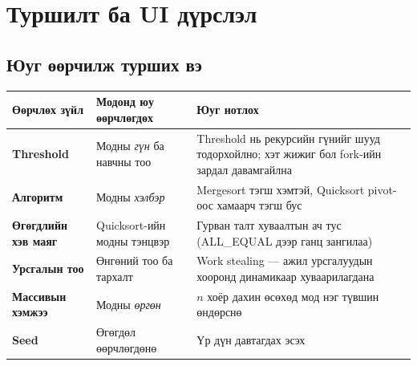 \documentclass[11pt,a4paper]{article}
\begin{document}
\section{Туршилт ба UI дүрслэл}

\subsection{Юуг өөрчилж турших вэ}
\begin{center}
\small
\begin{tabular}{L{3.0cm}L{4.6cm}L{6.6cm}}
\toprule
Өөрчлөх зүйл & Модонд юу өөрчлөгдөх & Юуг нотлох \\
\midrule
\textbf{Threshold} & Модны \emph{гүн} ба навчны тоо &
Threshold нь рекурсийн гүнийг шууд тодорхойлно; хэт жижиг бол fork-ийн
зардал давамгайлна \\
\textbf{Алгоритм} & Модны \emph{хэлбэр} &
Mergesort тэгш хэмтэй, Quicksort pivot-оос хамаарч тэгш бус \\
\textbf{Өгөгдлийн хэв маяг} & Quicksort-ийн модны тэнцвэр &
Гурван талт хуваалтын ач тус (ALL\_EQUAL дээр ганц зангилаа) \\
\textbf{Урсгалын тоо} & Өнгөний тоо ба тархалт &
Work stealing --- ажил урсгалуудын хооронд динамикаар хуваарилагдана \\
\textbf{Массивын хэмжээ} & Модны \emph{өргөн} &
$n$ хоёр дахин өсөхөд мод нэг түвшин өндөрснө \\
\textbf{Seed} & Өгөгдөл өөрчлөгдөнө & Үр дүн давтагдах эсэх \\
\bottomrule
\end{tabular}
\end{center}
\end{document}
